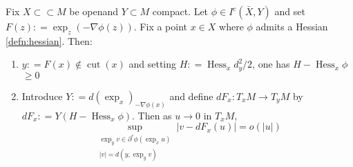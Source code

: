 \begin{prop} 
	\label{prop:differentiate_optimal_transport}
	Fix \( X \subset \subset M \) be openand \( Y \subset M \) compact. Let \( \phi \in I ^ { c } ( \bar { X } , Y ) \) and set \( F ( z ) : = \exp _ { z } ( - \nabla \phi ( z ) ) . \)
	Fix a point \( x \in X \) where \( \phi \) admits a Hessian \cref{defn:hessian}.
	Then:
	\begin{enumerate}
		\item \( y : = F ( x ) \notin \operatorname { cut } ( x ) \) and setting \( H : = \operatorname { Hess } _ { x } d _ { y } ^ { 2 } / 2 \), one has \( H - \operatorname { Hess } _ { x } \phi \) \( \geq 0 \)
		\item Introduce \( Y : = d \left( \exp _ { x } \right) _ { - \nabla \phi ( x ) } \) and define \( d F _ { x } : T _ { x } M \longrightarrow T _ { y } M \) by
		      \( d F _ { x } : = Y \left( H - \operatorname { Hess } _ { x } \phi \right) \). Then as \( u \rightarrow 0 \) in \( T _ { x } M \),
		      \begin{equation}
			      \sup _ {\substack {\exp _ { y } v \in \partial ^ { c } \phi \left( \exp _ { x } u \right) \\ | v | = d \left( y , \exp _ { y } v \right)} } \left| v - d F _ { x } ( u ) \right| = o ( | u | )
		      \end{equation}

	\end{enumerate}
\end{prop}

